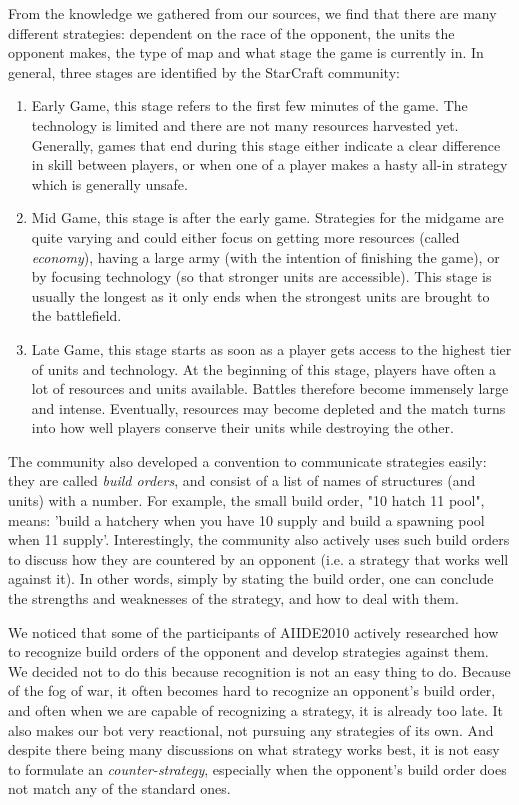 From the knowledge we gathered from our sources, we find that there are many different strategies: dependent on the race of the opponent, the units the opponent makes, the type of map and what stage the game is currently in. In general, three stages are identified by the StarCraft community:
\begin{enumerate}
\item Early Game, this stage refers to the first few minutes of the game. The technology is limited and there are not many resources harvested yet. Generally, games that end during this stage either indicate a clear difference in skill between players, or when one of a player makes a hasty all-in strategy which is generally unsafe.
\item Mid Game, this stage is after the early game. Strategies for the midgame are quite varying and could either focus on getting more resources (called \emph{economy}), having a large army (with the intention of finishing the game), or by focusing technology (so that stronger units are accessible). This stage is usually the longest as it only ends when the strongest units are brought to the battlefield.
\item Late Game, this stage starts as soon as a player gets access to the highest tier of units and technology. At the beginning of this stage, players have often a lot of resources and units available. Battles therefore become immensely large and intense. Eventually, resources may become depleted and the match turns into how well players conserve their units while destroying the other.
\end{enumerate}

The community also developed a convention to communicate strategies easily: they are called \emph{build orders}, and consist of a list of names of structures (and units) with a number. For example, the small build order, "10 hatch 11 pool", means: 'build a hatchery when you have 10 supply and build a spawning pool when 11 supply'. Interestingly, the community also actively uses such build orders to discuss how they are countered by an opponent (i.e. a strategy that works well against it). In other words, simply by stating the build order, one can conclude the strengths and weaknesses of the strategy, and how to deal with them.

We noticed that some of the participants of AIIDE2010 actively researched how to recognize build orders of the opponent and develop strategies against them. We decided not to do this because recognition is not an easy thing to do. Because of the fog of war, it often becomes hard to recognize an opponent's build order, and often when we are capable of recognizing a strategy, it is already too late. It also makes our bot very reactional, not pursuing any strategies of its own. And despite there being many discussions on what strategy works best, it is not easy to formulate an \emph{counter-strategy}, especially when the opponent's build order does not match any of the standard ones.

